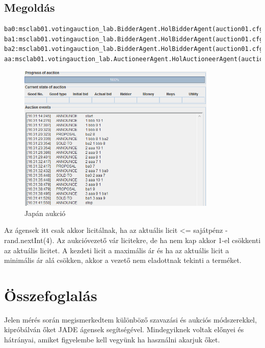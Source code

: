 \subsection{Megoldás}
\begin{lstlisting}[caption=Használt run-config, frame=single,float=!ht]
ba0:msclab01.votingauction_lab.BidderAgent.HolBidderAgent(auction01.cfg)
ba1:msclab01.votingauction_lab.BidderAgent.HolBidderAgent(auction01.cfg)
ba2:msclab01.votingauction_lab.BidderAgent.HolBidderAgent(auction01.cfg)
aa:msclab01.votingauction_lab.AuctioneerAgent.HolAuctioneerAgent(auction01.cfg)
\end{lstlisting}
\begin{figure}[!h]
\begin{center}
\includegraphics[height=7cm]{figures/fel5.png}
\caption{Japán aukció}
\end{center}
\end{figure}
Az ágensek itt csak akkor licitálnak, ha az aktuális licit <= sajátpénz - rand.nextInt(4). Az aukcióvezető vár licitekre, de ha nem kap akkor 1-el csökkenti az aktuális licitet. A kezdeti licit a maximális ár és ha az aktuális licit a minimális ár alá csökken, akkor a vezető nem eladottnak tekinti a terméket.


\section{Összefoglalás}
Jelen mérés során megismerkedtem különböző szavazási és aukciós módszerekkel, kipróbálván őket JADE ágensek segítségével. Mindegyiknek voltak előnyei és hátrányai, amiket figyelembe kell vegyünk ha használni akarjuk őket.